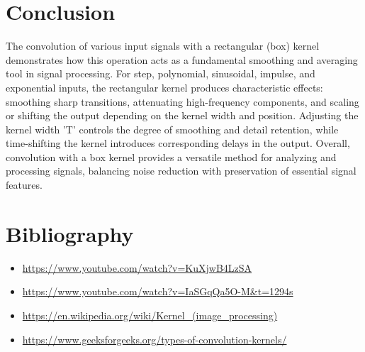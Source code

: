 \documentclass[12pt,a4paper]{report}
\begin{document}
\chapter{Conclusion}

The convolution of various input signals with a rectangular (box) kernel demonstrates how this operation acts as a fundamental smoothing and averaging tool in signal processing. For step, polynomial, sinusoidal, impulse, and exponential inputs, the rectangular kernel produces characteristic effects: smoothing sharp transitions, attenuating high-frequency components, and scaling or shifting the output depending on the kernel width and position. \newline
Adjusting the kernel width 'T' controls the degree of smoothing and detail retention, while time-shifting the kernel introduces corresponding delays in the output. Overall, convolution with a box kernel provides a versatile method for analyzing and processing signals, balancing noise reduction with preservation of essential signal features.
\chapter{Bibliography}
\begin{itemize}
    \item \url{https://www.youtube.com/watch?v=KuXjwB4LzSA}
    \item \url{https://www.youtube.com/watch?v=IaSGqQa5O-M&t=1294s}
    \item \url{https://en.wikipedia.org/wiki/Kernel_(image_processing)}
    \item \url{https://www.geeksforgeeks.org/types-of-convolution-kernels/}
\end{itemize}
\end{document}
